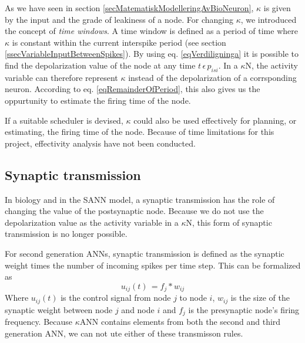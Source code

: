 	As we have seen in section \ref{secMatematiskModelleringAvBioNeuron}, $\kappa$ is given by the input and the grade of leakiness of a node.
	For changing $\kappa$, we introduced the concept of \emph{time windows}. 
	A time window is defined as a period of time where $\kappa$ is constant within the current interspike period (see section \ref{ssecVariableInputBetweenSpikes}).
	By using eq. \eqref{eqVerdiligninga} it is possible to find the depolarization value of the node at any time $t \, \epsilon \, p_{isi}$.
	In a $\kappa$N, the activity variable can therefore represent $\kappa$ instead of the depolarization of a corrsponding neuron.
	According to eq. \eqref{eqRemainderOfPeriod}, this also gives us the oppurtunity to estimate the firing time of the node.
	
	If a suitable scheduler is devised, $\kappa$ could also be used effectively for planning, or estimating, the firing time of the node.
	Because of time limitations for this project, effectivity analysis have not been conducted. %

	
	\subsection{Synaptic transmission}

		In biology and in the SANN model, a synaptic transmission has the role of changing the value of the postsynaptic node.
		Because we do not use the depolarization value as the activity variable in a $\kappa$N, this form of synaptic transmission is no longer possible. %

		For second generation ANNs, synaptic transmission is defined as the synaptic weight times the number of incoming spikes per time step.
		This can be formalized as
		\begin{equation}
			u_{ij}(t) \, = f_{j} * w_{ij}
			\label{eqSynapticTransmissionFor2genANN}
		\end{equation}
		Where $u_{ij}(t)$ is the control signal from node $j$ to node $i$, $w_{ij}$ is the size of the synaptic weight between node $j$ and node $i$ and $f_j$ is the presynaptic node's firing frequency.
		Because $\kappa$ANN contains elements from both the second and third generation ANN, %
																							 we can not ute either of these transmisson rules.


